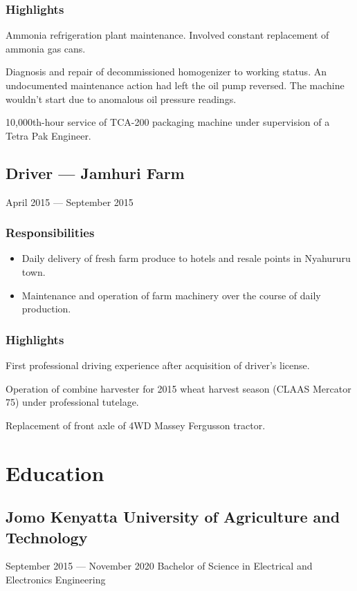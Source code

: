 \documentclass[a4paper]{article}
\begin{document}
\subsubsection{Highlights}
Ammonia refrigeration plant maintenance. Involved constant replacement of ammonia gas cans.

Diagnosis and repair of decommissioned homogenizer to working status. An undocumented maintenance action had left the oil pump reversed. The machine wouldn't start due to anomalous oil pressure readings.

10,000th-hour service of TCA-200 packaging machine under supervision of a Tetra Pak Engineer.

\subsection{Driver --- Jamhuri Farm}
April 2015 --- September 2015
\subsubsection{Responsibilities}
\begin{itemize}
	\item Daily delivery of fresh farm produce to hotels and resale points in Nyahururu town.
	\item Maintenance and operation of farm machinery over the course of daily production.
\end{itemize}
\subsubsection{Highlights}
First professional driving experience after acquisition of driver's license.

Operation of combine harvester for 2015 wheat harvest season (CLAAS Mercator 75) under professional tutelage.

Replacement of front axle of 4WD Massey Fergusson tractor.

\section{Education}
\subsection{Jomo Kenyatta University of Agriculture and Technology}
September 2015 --- November 2020
Bachelor of Science in Electrical and Electronics Engineering
\end{document}
